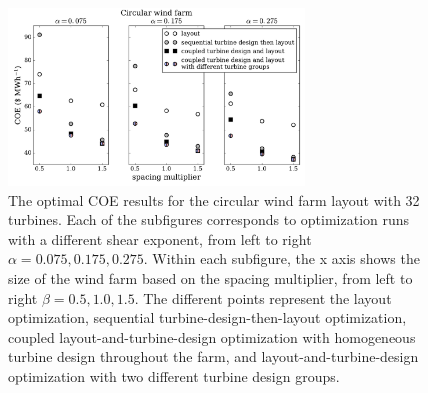 \documentclass[wes, manuscript]{copernicus}
\begin{document}
\begin{figure}[htbp]
  \centering
  \includegraphics[width=0.7\textwidth]{Figures/circular_results1.pdf}
  \caption{\label{circular_results} The optimal COE results for the circular wind farm layout with 32 turbines. Each of the subfigures corresponds to optimization runs with a different shear exponent, from left to right $\alpha=0.075,0.175,0.275$. Within each subfigure, the x axis shows the size of the wind farm based on the spacing multiplier, from left to right $\beta=0.5,1.0,1.5$. The different points represent the layout optimization, sequential turbine-design-then-layout optimization, coupled layout-and-turbine-design optimization with homogeneous turbine design throughout the farm, and layout-and-turbine-design optimization with two different turbine design groups.}
\end{figure}
\end{document}
